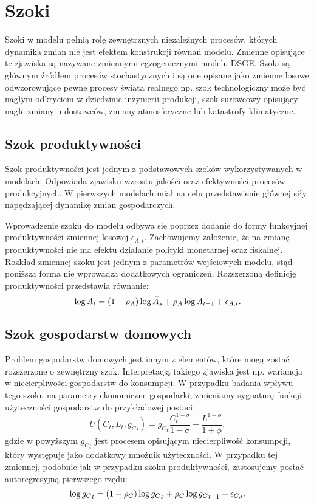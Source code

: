 \section{Szoki}
\label{sec:shocks}

Szoki w modelu pełnią rolę zewnętrznych niezależnych procesów, których dynamika zmian nie jest efektem konstrukcji równań modelu. Zmienne opisujące te zjawiska są nazywane zmiennymi egzogenicznymi modelu DSGE. Szoki są głównym źródłem procesów stochastycznych i są one opisane jako zmienne losowe odwzorowujące pewne procesy świata realnego np. szok technologiczny może być nagłym odkryciem w dziedzinie inżynierii produkcji, szok surowcowy opisujący nagłe zmiany u dostawców, zmiany atmosferyczne lub katastrofy klimatyczne.


\subsection{Szok produktywności}
\label{sec:shocks_prod}

Szok produktywności jest jednym z podstawowych szoków wykorzystywanych w modelach. Odpowiada zjawisku wzrostu jakości oraz efektywności procesów produkcyjnych. W pierwszych modelach miał na celu przedstawienie głównej siły napędzającej dynamikę zmian gospodarczych. 

Wprowadzenie szoku do modelu odbywa się poprzez dodanie do formy funkcyjnej produktywności zmiennej losowej $\epsilon_{A,t}$. Zachowujemy założenie, że na zmianę produktywności nie ma efektu działanie polityki monetarnej oraz fiskalnej. Rozkład zmiennej szoku jest jednym z parametrów wejściowych modelu, stąd poniższa forma nie wprowadza dodatkowych ograniczeń. Rozszerzoną definicję produktywności przedstawia równanie:
\begin{equation}
        \log{A_t} = (1-\rho_A)\log {\bar{A}_s} + \rho_A \log {A_{t-1}} + \epsilon_{A,t}.
\end{equation}

\subsection{Szok gospodarstw domowych}

Problem gospodarstw domowych jest innym z elementów, które mogą zostać rozszerzone o zewnętrzny szok. Interpretacją takiego zjawiska jest np. wariancja w niecierpliwości gospodarstw do konsumpcji. W przypadku badania wpływu tego szoku na parametry ekonomiczne gospodarki, zmieniamy sygnaturę funkcji użyteczności gospodarstw do przykładowej postaci:
\begin{equation}
    U(C_t, L_t, {g_C}_t) = {g_C}_t\frac{C_t^{1-\sigma}}{1-\sigma} - \frac{L^{1+\phi}}{1+\phi},
\end{equation}
gdzie w powyższym ${g_C}_t$ jest procesem opisującym niecierpliwość konsumpcji, który występuje jako dodatkowy mnożnik użyteczności. W przypadku tej zmiennej, podobnie jak w przypadku szoku produktywności, zastosujemy postać autoregresyjną pierwszego rzędu:
\begin{equation}
        \log{{g_C}_t} = (1-\rho_C)\log {\bar{g_C}_s} + \rho_C \log {{g_C}_{t-1}} + \epsilon_{C,t}.
\end{equation}

